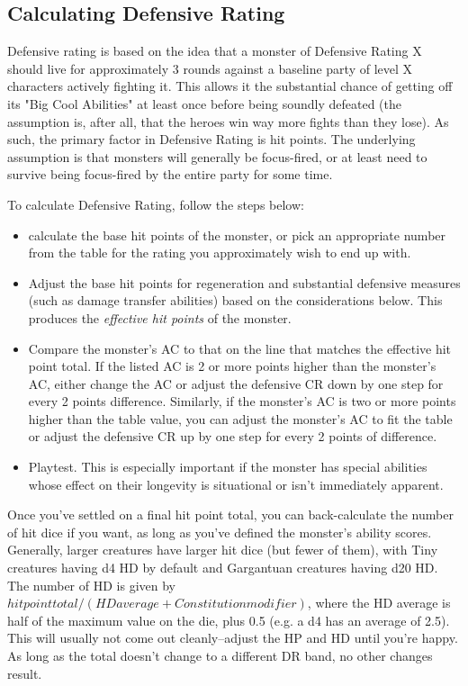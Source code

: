 \subsection{Calculating Defensive Rating}

Defensive rating is based on the idea that a monster of Defensive Rating X should live for approximately 3 rounds against a baseline party of level X characters actively fighting it. This allows it the substantial chance of getting off its "Big Cool Abilities" at least once before being soundly defeated (the assumption is, after all, that the heroes win way more fights than they lose). As such, the primary factor in Defensive Rating is hit points. The underlying assumption is that monsters will generally be focus-fired, or at least need to survive being focus-fired by the entire party for some time.

To calculate Defensive Rating, follow the steps below:
\begin{itemize}
	\item calculate the base hit points of the monster, or pick an appropriate number from the  table for the rating you approximately wish to end up with.
	\item Adjust the base hit points for regeneration and substantial defensive measures (such as damage transfer abilities) based on the considerations below. This produces the \textit{effective hit points} of the monster. 
	\item Compare the monster's AC to that on the line that matches the effective hit point total. If the listed AC is 2 or more points higher than the monster's AC, either change the AC or adjust the defensive CR down by one step for every 2 points difference. Similarly, if the monster's AC is two or more points higher than the table value, you can adjust the monster's AC to fit the table or adjust the defensive CR up by one step for every 2 points of difference.
	\item Playtest. This is especially important if the monster has special abilities whose effect on their longevity is situational or isn't immediately apparent.
\end{itemize}

Once you've settled on a final hit point total, you can back-calculate the number of hit dice if you want, as long as you've defined the monster's ability scores. Generally, larger creatures have larger hit dice (but fewer of them), with Tiny creatures having d4 HD by default and Gargantuan creatures having d20 HD. The number of HD is given by $hit point total/(HD average + Constitution modifier)$, where the HD average is half of the maximum value on the die, plus 0.5 (e.g. a d4 has an average of 2.5). This will usually not come out cleanly--adjust the HP and HD until you're happy. As long as the total doesn't change to a different DR band, no other changes result.

